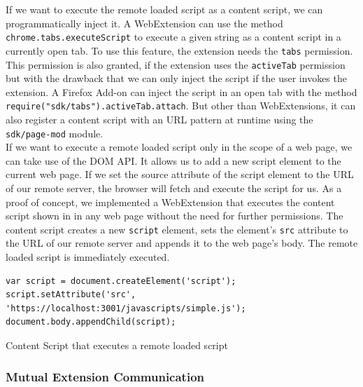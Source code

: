 			If we want to execute the remote loaded script as a content script, we can programmatically inject it. A WebExtension can use the method \texttt{chrome.tabs.executeScript} to execute a given string as a content script in a currently open tab. To use this feature, the extension needs the \texttt{tabs} permission. This permission is also granted, if the extension uses the \texttt{activeTab} permission but with the drawback that we can only inject the script if the user invokes the extension. A Firefox Add-on can inject the script in an open tab with the method \texttt{require("sdk/tabs").activeTab.attach}. But other than WebExtensions, it can also register a content script with an URL pattern at runtime using the \texttt{sdk/page-mod} module. \\
			
			If we want to execute a remote loaded script only in the scope of a web page, we can take use of the DOM API. It allows us to add a new script element to the current web page. If we set the source attribute of the script element to the URL of our remote server, the browser will fetch and execute the script for us. As a proof of concept, we  implemented a WebExtension that executes the content script shown in  in any web page without the need for further permissions. The content script creates a new \texttt{script} element, sets the element's \texttt{src} attribute to the URL of our remote server and appends it to the web page's body. The remote loaded script is immediately executed.
			
			\begin{code}
				\begin{lstlisting}	
var script = document.createElement('script');
script.setAttribute('src', 'https://localhost:3001/javascripts/simple.js');
document.body.appendChild(script);
				\end{lstlisting}
				\caption{Content Script that executes a remote loaded script}
				\label{contentScriptRemotLoad}
			\end{code}
		
	
		\subsubsection{Mutual Extension Communication}
				

